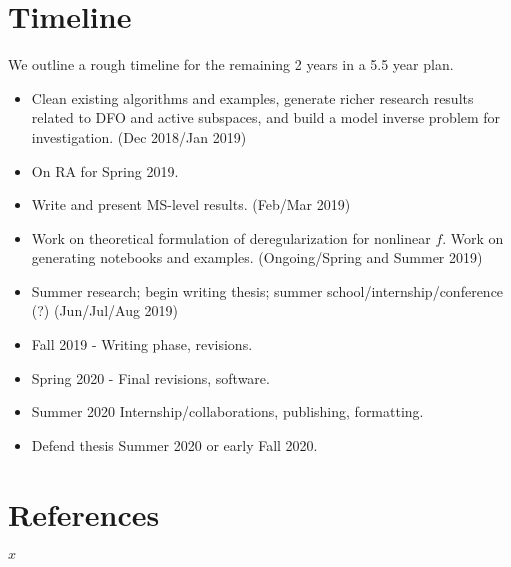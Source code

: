 \documentclass[11pt]{beamer}
\begin{document}
\section{Timeline}
\begin{frame}

We outline a rough timeline for the remaining 2 years in a 5.5 year plan.

\begin{itemize}
\tiny

\item Clean existing algorithms and examples, generate richer research results related to DFO and active subspaces, and build a model inverse problem for investigation. (Dec 2018/Jan 2019)

\item On RA for Spring 2019.

\item Write and present MS-level results. (Feb/Mar 2019)

\item Work on theoretical formulation of deregularization for nonlinear $f$. Work on generating notebooks and examples. (Ongoing/Spring and Summer 2019)

\item Summer research; begin writing thesis; summer school/internship/conference (?) (Jun/Jul/Aug 2019)

\item Fall 2019 - Writing phase, revisions.

\item Spring 2020 - Final revisions, software.

\item Summer 2020 Internship/collaborations, publishing, formatting.

\item Defend thesis Summer 2020 or early Fall 2020.


\end{itemize}


\end{frame}




\section{References}
\begin{frame}

$x$

\end{frame}
\end{document}
